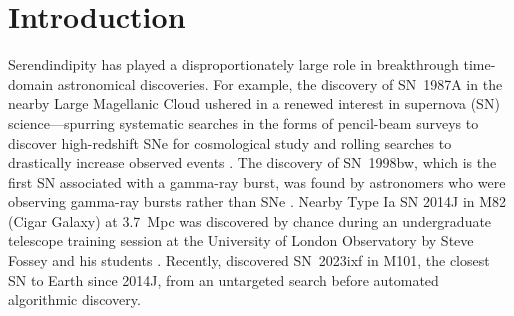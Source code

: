 \documentclass[twocolumn]{aastex63}
\begin{document}

\section{Introduction} 
\label{sec:intro}

Serendindipity has played a disproportionately large role in breakthrough time-domain astronomical discoveries. For example, the discovery of SN~1987A \citep{Kunkel1987} in the nearby Large Magellanic Cloud ushered in a renewed interest in supernova (SN) science---spurring systematic searches in the forms of pencil-beam surveys to discover high-redshift SNe for cosmological study \citep{Perlmutter1997,Schmidt1998} and rolling searches to drastically increase observed events \citep{Barris2004}. The discovery of SN~1998bw, which is the first SN associated with a gamma-ray burst, was found by astronomers who were observing gamma-ray bursts rather than SNe \citep{Galama1998}. Nearby Type Ia SN 2014J in M82 (Cigar Galaxy) at 3.7~Mpc was discovered by chance during an undergraduate telescope training session at the University of London Observatory by Steve Fossey and his students \citep{Fossey2014, McIntosh2014AAS}. Recently, \cite{Itagaki2023ixfTNS} discovered SN~2023ixf in M101, the closest SN to Earth since 2014J, from an untargeted search before automated algorithmic discovery. \par
\end{document}

